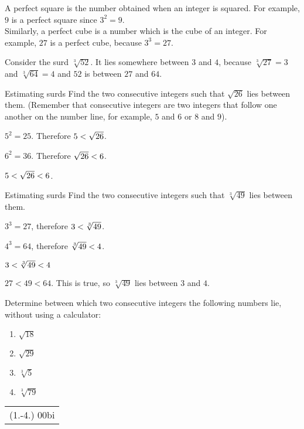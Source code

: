 \par
A perfect square is the number obtained when an integer is squared. For example, $9$ is a perfect square since ${3}^{2}=9$. \\Similarly, a perfect cube is a number which is the cube of an integer. For example, $27$ is a perfect cube, because ${3}^{3}=27$.
\par
Consider the surd $\sqrt[3]{52}$. It lies somewhere between $3$ and $4$, because $\sqrt[3]{27}=3$ and $\sqrt[3]{64}=4$ and $52$ is between $27$ and $64$. %

\begin{wex}{Estimating surds}
{%
Find the two consecutive integers such that $\sqrt{26}$ lies between them.
(Remember that consecutive integers are two integers that follow one
another on the number line, for example, $5$ and $6$ or $8$ and $9$).
}
{%

${5}^{2}=25$. Therefore $5<{}\sqrt{26}$.

${6}^{2}=36$. 
Therefore $\sqrt{26}<{}6$.

$5<{}\sqrt{26}<{}6$. 
}
\end{wex}


\begin{wex}{Estimating surds}
{%
Find the two consecutive integers such that $\sqrt[3]{49}$ lies between them.
}
{%

   ${3}^{3}=27$, therefore $3<{}\sqrt[3]{49}$.

 ${4}^{3}=64$, therefore $\sqrt[3]{49}<{}4$. 

$3<{}\sqrt[3]{49}<{}4$

$27<49<64$. This is true, so $\sqrt[3]{49}$ lies between $3$ and $4$.
}
\end{wex}

\begin{exercises}{}
{Determine between which two consecutive integers the following numbers lie, without using a calculator:
\begin{enumerate}[itemsep=0pt, label=\textbf{\arabic*}. ]
\item $\sqrt{18}$
\item $\sqrt{29}$
\item $\sqrt[3]{5}$
\item $\sqrt[3]{79}$

\end{enumerate}
\practiceinfo 
\par 
 \par \begin{tabular}[h]{c}
 (1.-4.) 00bi\end{tabular}
}
\end{exercises}



